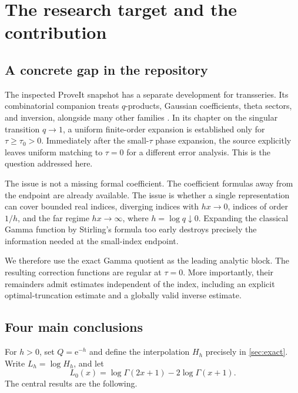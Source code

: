 \documentclass[11pt,a4paper]{article}
\numberwithin{equation}{section}
\theoremstyle{definition}
\newcommand{\ee}{\mathrm e}
\begin{document}
\tableofcontents
\newpage

\section{The research target and the contribution}
\label{sec:target}

\subsection{A concrete gap in the repository}
The inspected ProveIt snapshot has a separate  development for transseries. Its combinatorial companion treats $q$-products, Gaussian coefficients, theta sectors, and inversion, alongside many other families \cite{repo,reporeadme}. In its chapter on the singular transition $q\to1$, a uniform finite-order expansion is established only for $\tau\ge\tau_0>0$. Immediately after the small-$\tau$ phase expansion, the source explicitly leaves uniform matching to $\tau=0$ for a different error analysis. This is the question addressed here.

The issue is not a missing formal coefficient. The coefficient formulas away from the endpoint are already available. The issue is whether a single representation can cover bounded real indices, diverging indices with $hx\to0$, indices of order $1/h$, and the far regime $hx\to\infty$, where $h=\log q\downarrow0$. Expanding the classical Gamma function by Stirling's formula too early destroys precisely the information needed at the small-index endpoint.

We therefore use the exact Gamma quotient as the leading analytic block. The resulting correction functions are regular at $\tau=0$. More importantly, their remainders admit estimates independent of the index, including an explicit optimal-truncation estimate and a globally valid inverse estimate.

\subsection{Four main conclusions}
For $h>0$, set $Q=\ee^{-h}$ and define the interpolation $H_h$ precisely in \cref{sec:exact}. Write $L_h=\log H_h$, and let
\[
L_0(x)=\log\Gamma(2x+1)-2\log\Gamma(x+1).
\]
The central results are the following.
\end{document}
